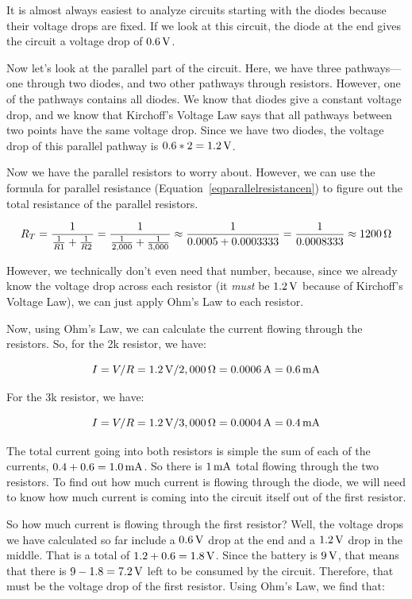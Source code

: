 
It is almost always easiest to analyze circuits starting with the diodes because their voltage drops are fixed.
If we look at this circuit, the diode at the end gives the circuit a voltage drop of $0.6\,\si{\volt}$.

Now let's look at the parallel part of the circuit.
Here, we have three pathways---one through two diodes, and two other pathways through resistors.
However, one of the pathways contains all diodes.
We know that diodes give a constant voltage drop, and we know that Kirchoff's Voltage Law says that all pathways between two points have the same voltage drop.
Since we have two diodes, the voltage drop of this parallel pathway is $0.6 * 2 = 1.2\,\si{\volt}$.

Now we have the parallel resistors to worry about.
However, we can use the formula for parallel resistance (Equation~\ref{eqparallelresistancen}) to figure out the total resistance of the parallel resistors.

$$ R_T = \frac{1}{\frac{1}{R1} + \frac{1}{R2}} = \frac{1}{\frac{1}{2,000} + \frac{1}{3,000}} \approx \frac{1}{0.0005 + 0.0003333} = \frac{1}{0.0008333} \approx 1200\,\si{\ohm} $$

However, we technically don't even need that number, because, since we already know the voltage drop across each resistor (it \emph{must} be $1.2\,\si{\volt}$ because of Kirchoff's Voltage Law), we can just apply Ohm's Law to each resistor.

Now, using Ohm's Law, we can calculate the current flowing through the resistors.
So, for the 2k resistor, we have:

$$ I = V / R = 1.2\,\si{\volt} / 2,000\,\si{\ohm} = 0.0006\,\si{\ampere} = 0.6\,\si{\milli\ampere} $$

For the 3k resistor, we have:

$$ I = V / R = 1.2\,\si{\volt} / 3,000\,\si{\ohm} = 0.0004\,\si{\ampere} = 0.4\,\si{\milli\ampere} $$

The total current going into both resistors is simple the sum of each of the currents, $0.4 + 0.6 = 1.0\,\si{\milli\ampere}$.
So there is $1\,\si{\milli\ampere}$ total flowing through the two resistors.
To find out how much current is flowing through the diode, we will need to know how much current is coming into the circuit itself out of the first resistor.

So how much current is flowing through the first resistor?
Well, the voltage drops we have calculated so far include a $0.6\,\si{\volt}$ drop at the end and a $1.2\,\si{\volt}$ drop in the middle.
That is a total of $1.2 + 0.6 = 1.8\,\si{\volt}$.
Since the battery is $9\,\si{\volt}$, that means that there is $9 - 1.8 = 7.2\,\si{\volt}$ left to be consumed by the circuit.
Therefore, that must be the voltage drop of the first resistor.
Using Ohm's Law, we find that:

